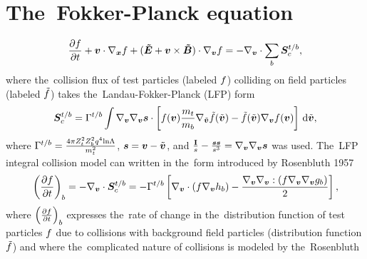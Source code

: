 \clearpage



\appendix
\section{The~Fokker-Planck equation}
\label{sed:FP}
\begin{equation}
  \frac{\partial{f}}{\partial{t}} + \boldsymbol{v}\cdot\nabla_{\boldsymbol{x}} f + (\boldsymbol{\tilde{E}} + \boldsymbol{v}\times\boldsymbol{\tilde{B}}) \cdot\nabla_{\boldsymbol{v}} f =
  - \nabla_{\boldsymbol{v}} \cdot \sum_{b}\boldsymbol{S}_c^{t/b} ,
  \nonumber
\end{equation}
where the~collision flux of test particles (labeled $f$) colliding on field
particles (labeled $\tilde{f}$) takes the~Landau-Fokker-Planck (LFP) form
\begin{equation}
  \boldsymbol{S}_c^{t/b} = \Gamma^{t/b}\int \nabla_{\boldsymbol{v}}\nabla_{\boldsymbol{v}}\boldsymbol{s} \cdot \left[ 
  f(\boldsymbol{v})\frac{m_t}{m_b}\nabla_{\tilde{\boldsymbol{v}}} \tilde{f}(\tilde{\boldsymbol{v}}) - \tilde{f}(\tilde{\boldsymbol{v}})\nabla_{\boldsymbol{v}} f(\boldsymbol{v})
  \right]\, \text{d}\tilde{\boldsymbol{v}} , \nonumber 
  \nonumber
\end{equation} 
where $\Gamma^{t/b} = \frac{4\pi Z_t^2Z_b^2 q^4 \text{ln}\Lambda}{m_t^2}$, $\boldsymbol{s} = \boldsymbol{v} - \tilde{\boldsymbol{v}}$, and 
$\frac{\mathbf{I}}{s} - \frac{\boldsymbol{s}\boldsymbol{s}}{s^3} = \nabla_{\boldsymbol{v}}\nabla_{\boldsymbol{v}}\boldsymbol{s}$ was used.
The~LFP integral collision model can written in the~form introduced by 
Rosenbluth 1957
\begin{equation}
  \left(\frac{\partial{f}}{\partial{t}}\right)_{b} = - \nabla_{\boldsymbol{v}} \cdot \boldsymbol{S}_c^{t/b} = 
  - \Gamma^{t/b} \left[ \nabla_{\boldsymbol{v}}\cdot\left(f \nabla_{\boldsymbol{v}}h_{b}\right)
  - \frac{\nabla_{\boldsymbol{v}}\nabla_{\boldsymbol{v}}:\left(f \nabla_{\boldsymbol{v}}\nabla_{\boldsymbol{v}}g_{b} \right)}{2}\right] ,
  \label{eq:FP_Rosenbluth}
\end{equation}
where $\left(\frac{\partial{f}}{\partial{t}}\right)_{b}$ expresses the~rate of change in 
the~distribution function of test particles $f$ due to collisions with
background field particles (distribution function $\tilde{f}$) and
where the~complicated nature of collisions is modeled by the~Rosenbluth 
